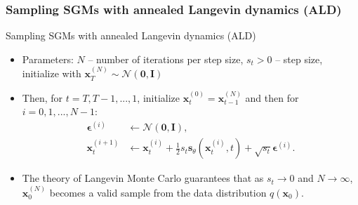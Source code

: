\documentclass{beamer}
\begin{document}
\subsubsection{Sampling SGMs with annealed Langevin dynamics (ALD)}
\begin{frame}{Sampling SGMs with annealed Langevin dynamics (ALD)}
\begin{itemize}
  \item Parameters: $N$ -- number of iterations per step size, $s_t > 0 $ -- step size, initialize with $\mathbf{x}_T^{(N)} \sim \mathcal{N}(\mathbf{0}, \mathbf{I})$
  \item Then, for $t=T,T-1,..., 1$, initialize $\mathbf{x}_t^{(0)} = \mathbf{x}_{t-1}^{(N)}$ and then for $i=0,1,...,N-1$:
  \begin{align}
    \boldsymbol{\epsilon}^{(i)} &\leftarrow \mathcal{N}(\mathbf{0}, \mathbf{I}), \\
    \mathbf{x}_t^{(i+1)} &\leftarrow \mathbf{x}_t^{(i)} + \frac{1}{2}s_t \mathbf{s}_\theta (\mathbf{x}_t^{(i)}, t) + \sqrt{s_t}\boldsymbol{\epsilon}^{(i)}.
  \end{align}
  \item The theory of Langevin Monte Carlo guarantees that as $s_t \to 0$ and $N \to \infty$, $\mathbf{x}_0^{(N)}$ becomes a valid sample from the data distribution $q(\mathbf{x}_0)$.
\end{itemize}
\end{frame}
\end{document}
